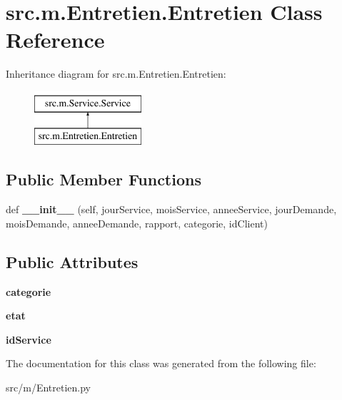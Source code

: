\hypertarget{classsrc_1_1m_1_1_entretien_1_1_entretien}{}\section{src.\+m.\+Entretien.\+Entretien Class Reference}
\label{classsrc_1_1m_1_1_entretien_1_1_entretien}
Inheritance diagram for src.\+m.\+Entretien.\+Entretien\+:\begin{figure}[H]
\begin{center}
\leavevmode
\includegraphics[height=2.000000cm]{classsrc_1_1m_1_1_entretien_1_1_entretien}
\end{center}
\end{figure}
\subsection*{Public Member Functions}
\begin{DoxyCompactItemize}
\item 
\hypertarget{classsrc_1_1m_1_1_entretien_1_1_entretien_af37f78c42c33b1f05430c2f6367753f9}{}def {\bfseries \+\_\+\+\_\+init\+\_\+\+\_\+} (self, jour\+Service, mois\+Service, annee\+Service, jour\+Demande, mois\+Demande, annee\+Demande, rapport, categorie, id\+Client)\label{classsrc_1_1m_1_1_entretien_1_1_entretien_af37f78c42c33b1f05430c2f6367753f9}

\end{DoxyCompactItemize}
\subsection*{Public Attributes}
\begin{DoxyCompactItemize}
\item 
\hypertarget{classsrc_1_1m_1_1_entretien_1_1_entretien_aa8c4a9d10dd18fb14545b1d9b785bc81}{}{\bfseries categorie}\label{classsrc_1_1m_1_1_entretien_1_1_entretien_aa8c4a9d10dd18fb14545b1d9b785bc81}

\item 
\hypertarget{classsrc_1_1m_1_1_entretien_1_1_entretien_afc9b1f684ce2054c7f06cb74b357ced8}{}{\bfseries etat}\label{classsrc_1_1m_1_1_entretien_1_1_entretien_afc9b1f684ce2054c7f06cb74b357ced8}

\item 
\hypertarget{classsrc_1_1m_1_1_entretien_1_1_entretien_af21b2b8d0978bc48cae32d84d717182a}{}{\bfseries id\+Service}\label{classsrc_1_1m_1_1_entretien_1_1_entretien_af21b2b8d0978bc48cae32d84d717182a}

\end{DoxyCompactItemize}


The documentation for this class was generated from the following file\+:\begin{DoxyCompactItemize}
\item 
src/m/Entretien.\+py\end{DoxyCompactItemize}
